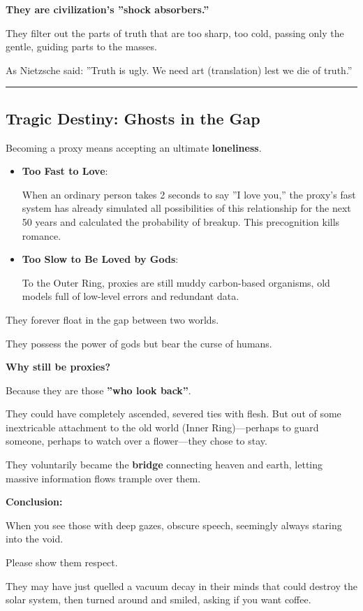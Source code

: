 \textbf{They are civilization's ''shock absorbers.''}

They filter out the parts of truth that are too sharp, too cold, passing only the gentle, guiding parts to the masses.

As Nietzsche said: ''Truth is ugly. We need art (translation) lest we die of truth.''

\hrule

\subsection{Tragic Destiny: Ghosts in the Gap}

Becoming a proxy means accepting an ultimate \textbf{loneliness}.

\begin{itemize}
\item \textbf{Too Fast to Love}:

    When an ordinary person takes 2 seconds to say ''I love you,'' the proxy's fast system has already simulated all possibilities of this relationship for the next 50 years and calculated the probability of breakup. This precognition kills romance.

\item \textbf{Too Slow to Be Loved by Gods}:

    To the Outer Ring, proxies are still muddy carbon-based organisms, old models full of low-level errors and redundant data.
\end{itemize}

They forever float in the gap between two worlds.

They possess the power of gods but bear the curse of humans.

\textbf{Why still be proxies?}

Because they are those \textbf{''who look back''}.

They could have completely ascended, severed ties with flesh. But out of some inextricable attachment to the old world (Inner Ring)---perhaps to guard someone, perhaps to watch over a flower---they chose to stay.

They voluntarily became the \textbf{bridge} connecting heaven and earth, letting massive information flows trample over them.

\textbf{Conclusion:}

When you see those with deep gazes, obscure speech, seemingly always staring into the void.

Please show them respect.

They may have just quelled a vacuum decay in their minds that could destroy the solar system, then turned around and smiled, asking if you want coffee.

